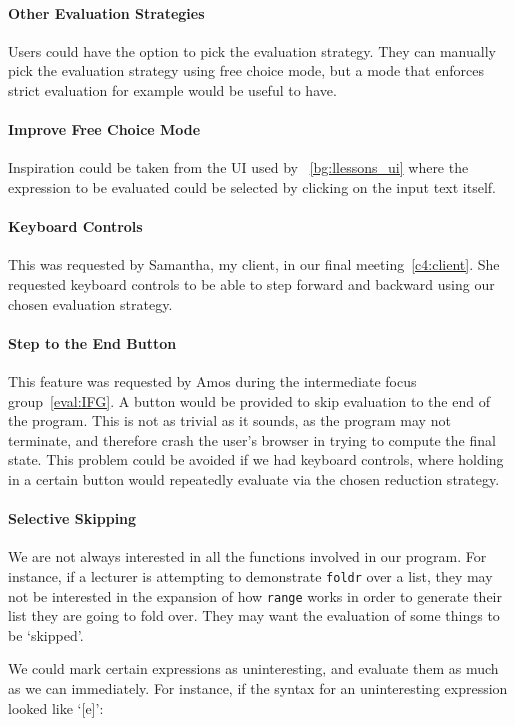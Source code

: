 \paragraph{Other Evaluation Strategies}
Users could have the option to pick the evaluation strategy. They can manually pick the evaluation strategy using free choice mode, but a mode that enforces strict evaluation for example would be useful to have. 
\paragraph{Improve Free Choice Mode}
Inspiration could be taken from the UI used by \llessons~\ref{bg:llessons_ui} where the expression to be evaluated could be selected by clicking on the input text itself. 
\paragraph{Keyboard Controls} This was requested by Samantha, my client, in our final meeting~\ref{c4:client}. She requested keyboard controls to be able to step forward and backward using our chosen evaluation strategy. 
\paragraph{Step to the End Button} This feature was requested by Amos during the intermediate focus group~\ref{eval:IFG}. A button would be provided to skip evaluation to the end of the program. This is not as trivial as it sounds, as the program may not terminate, and therefore crash the user's browser in trying to compute the final state. This problem could be avoided if we had keyboard controls, where holding in a certain button would repeatedly evaluate via the chosen reduction strategy. 
\paragraph{Selective Skipping}
\label{fw:function_checkboxes}
We are not always interested in all the functions involved in our program. For instance, if a lecturer is attempting to demonstrate \verb|foldr| over a list, they may not be interested in the expansion of how \verb|range| works in order to generate their list they are going to fold over. They may want the evaluation of some things to be `skipped'. 

We could mark certain expressions as uninteresting, and evaluate them as much as we can immediately. For instance, if the syntax for an uninteresting expression looked like `[e]':

